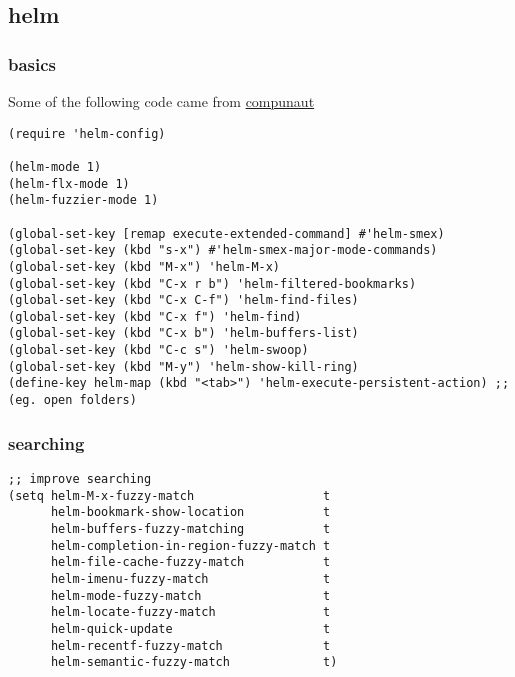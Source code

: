 \documentclass[11pt]{article}
\begin{document}
\subsection{helm}
\label{sec-2-2}
\subsubsection{basics}
\label{sec-2-2-1}
Some of the following code came from \href{https://github.com/compunaut/helm-ido-like-guide}{compunaut}
\begin{verbatim}
(require 'helm-config)

(helm-mode 1)
(helm-flx-mode 1)
(helm-fuzzier-mode 1)

(global-set-key [remap execute-extended-command] #'helm-smex)
(global-set-key (kbd "s-x") #'helm-smex-major-mode-commands)
(global-set-key (kbd "M-x") 'helm-M-x)
(global-set-key (kbd "C-x r b") 'helm-filtered-bookmarks)
(global-set-key (kbd "C-x C-f") 'helm-find-files)
(global-set-key (kbd "C-x f") 'helm-find)
(global-set-key (kbd "C-x b") 'helm-buffers-list)
(global-set-key (kbd "C-c s") 'helm-swoop)
(global-set-key (kbd "M-y") 'helm-show-kill-ring)
(define-key helm-map (kbd "<tab>") 'helm-execute-persistent-action) ;; (eg. open folders)
\end{verbatim}
\subsubsection{searching}
\label{sec-2-2-2}
\begin{verbatim}
;; improve searching
(setq helm-M-x-fuzzy-match                  t
      helm-bookmark-show-location           t
      helm-buffers-fuzzy-matching           t
      helm-completion-in-region-fuzzy-match t
      helm-file-cache-fuzzy-match           t
      helm-imenu-fuzzy-match                t
      helm-mode-fuzzy-match                 t
      helm-locate-fuzzy-match               t 
      helm-quick-update                     t
      helm-recentf-fuzzy-match              t
      helm-semantic-fuzzy-match             t)
\end{verbatim}
\end{document}
